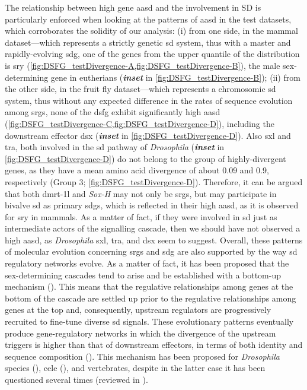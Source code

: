 The relationship between high gene \gls{aasd} and the involvement in SD is particularly enforced when looking at the patterns of \gls{aasd} in the test datasets, which corroborates the solidity of our analysis: (i) from one side, in the mammal dataset—which represents a strictly genetic \gls{sd} system, thus with a master and rapidly-evolving \gls{sdg}, one of the genes from the \fivepercent upper quantile of the distribution is \gls{sry} (\cref{fig:DSFG_testDivergence-A,fig:DSFG_testDivergence-B}), the male sex-determining gene in eutherians (\textbf{\textit{inset}} in \cref{fig:DSFG_testDivergence-B}); (ii) from the other side, in the fruit fly dataset—which represents a chromosomic \gls{sd} system, thus without any expected difference in the rates of sequence evolution among \glspl{srg}, none of the \gls{dsfg} exhibit significantly high \gls{aasd} (\cref{fig:DSFG_testDivergence-C,fig:DSFG_testDivergence-D}), including the downstream effector \gls{dsx} (\textit{\textbf{inset}} in \cref{fig:DSFG_testDivergence-D}). Also \gls{sxl} and \gls{tra}, both involved in the \gls{sd} pathway of \textit{Drosophila} (\textit{\textbf{inset}} in \cref{fig:DSFG_testDivergence-D}) do not belong to the group of highly-divergent genes, as they have a mean amino acid divergence of about 0.09 and 0.9, respectively (Group 3; \cref{fig:DSFG_testDivergence-D}). Therefore, it can be argued that both \gls{dmrt-1l} and \textit{Sox-H} may not only be \glspl{srg}, but may participate in bivalve \gls{sd} as primary \glspl{sdg}, which is reflected in their high \gls{aasd}, as it is observed for \gls{sry} in mammals. As a matter of fact, if they were involved in \gls{sd} just as intermediate actors of the signalling cascade, then we should have not observed a high \gls{aasd}, as \textit{Drosophila} \gls{sxl}, \gls{tra}, and \gls{dsx} seem to suggest. Overall, these patterns of molecular evolution concerning \glspl{srg} and \gls{sdg} are also supported by the way \gls{sd} regulatory networks evolve. As a matter of fact, it has been proposed that the sex-determining cascades tend to arise and be established with a bottom-up mechanism (). This means that the regulative relationships among genes at the bottom of the cascade are settled up prior to the regulative relationships among genes at the top and, consequently, upstream regulators are progressively recruited to fine-tune diverse \gls{sd} signals. These evolutionary patterns eventually produce gene-regulatory networks in which the divergence of the upstream triggers is higher than that of downstream effectors, in terms of both identity and sequence composition (). This mechanism has been proposed for \textit{Drosophila} species (), \gls{cele} (), and vertebrates, despite in the latter case it has been questioned several times (reviewed in ).

